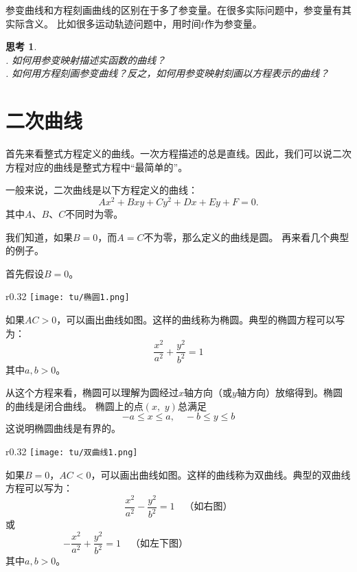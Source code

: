 \documentclass[12pt,UTF8]{ctexbook}
\theoremstyle{definition}
\theoremstyle{plain}
\newtheorem{sk}{思考}[section]
\begin{document}
参变曲线和方程刻画曲线的区别在于多了参变量。在很多实际问题中，参变量有其实际含义。
比如很多运动轨迹问题中，用时间$t$作为参变量。

\begin{sk}
    \mbox{} \\
    . 如何用参变映射描述实函数的曲线？\\
    . 如何用方程刻画参变曲线？反之，如何用参变映射刻画以方程表示的曲线？
\end{sk}

\section{二次曲线}

首先来看整式方程定义的曲线。一次方程描述的总是直线。因此，我们可以说二次方程对应的曲线是整式方程中“最简单的”。

一般来说，二次曲线是以下方程定义的曲线：
$$ Ax^2 + Bxy + Cy^2 + Dx + Ey + F = 0.$$
其中$A$、$B$、$C$不同时为零。

我们知道，如果$B = 0$，而$A = C$不为零，那么定义的曲线是圆。
再来看几个典型的例子。

首先假设$B = 0$。

\begin{wrapfigure}[5]{r}{0.32\textwidth} %
    \vspace{-30pt}
    \flushright
    \texttt{[image: tu/椭圆1.png]}
\end{wrapfigure}

如果$AC > 0$，可以画出曲线如图。这样的曲线称为椭圆。典型的椭圆方程可以写为：
$$ \frac{x^2}{a^2} + \frac{y^2}{b^2} = 1 $$
其中$a,b>0$。

从这个方程来看，椭圆可以理解为圆经过$x$轴方向（或$y$轴方向）放缩得到。椭圆的曲线是闭合曲线。
椭圆上的点$(x,\,\,y)$总满足
$$ -a \leqslant x \leqslant a, \quad -b \leqslant y \leqslant b$$
这说明椭圆曲线是有界的。

\begin{wrapfigure}[5]{r}{0.32\textwidth} %
    \vspace{-12pt}
    \flushright
    \texttt{[image: tu/双曲线1.png]}
\end{wrapfigure}

如果$B = 0$，$AC < 0$，可以画出曲线如图。这样的曲线称为双曲线。典型的双曲线方程可以写为：
$$ \frac{x^2}{a^2} - \frac{y^2}{b^2} = 1 \quad \mbox{（如右图）}$$
或
$$ - \frac{x^2}{a^2} + \frac{y^2}{b^2} = 1  \quad \mbox{（如左下图）} \qquad  \qquad  \qquad  \qquad \;\: \quad \phantom{123}$$
其中$a,b>0$。
\end{document}
